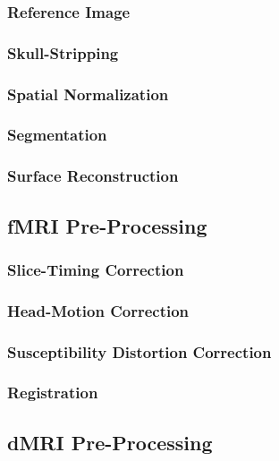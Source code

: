 \documentclass[conference]{IEEEtran}
\begin{document}
\subsubsection{Reference Image}


\subsubsection{Skull-Stripping}


\subsubsection{Spatial Normalization}


\subsubsection{Segmentation}


\subsubsection{Surface Reconstruction}


\subsection{fMRI Pre-Processing}
\subsubsection{Slice-Timing Correction}


\subsubsection{Head-Motion Correction}


\subsubsection{Susceptibility Distortion Correction}


\subsubsection{Registration}


\subsection{dMRI Pre-Processing}
\end{document}
